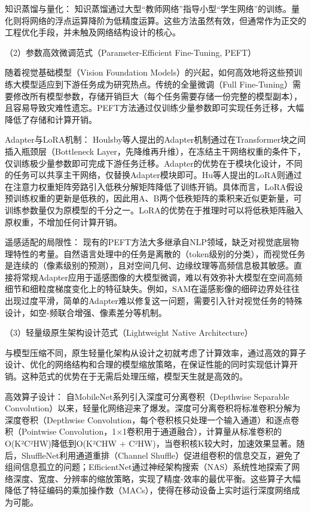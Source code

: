 知识蒸馏与量化： 知识蒸馏通过大型“教师网络”指导小型“学生网络”的训练。量化则将网络的浮点运算降阶为低精度运算。这些方法虽然有效，但通常作为正交的工程优化手段，并未触及网络结构设计的核心。

（2）参数高效微调范式（Parameter-Efficient Fine-Tuning, PEFT）

随着视觉基础模型（Vision Foundation Models）的兴起，如何高效地将这些预训练大模型适应到下游任务成为研究热点。传统的全量微调（Full Fine-Tuning）需要修改所有模型参数，存储开销巨大（每个任务需要存储一份完整的模型副本），且容易导致灾难性遗忘。PEFT方法通过仅训练少量参数即可实现任务迁移，大幅降低了存储和计算开销。

Adapter与LoRA机制： Houlsby等人提出的Adapter机制\cite{houlsby2019parameter}通过在Transformer块之间插入瓶颈层（Bottleneck Layer，先降维再升维），在冻结主干网络权重的条件下，仅训练极少量参数即可完成下游任务迁移。Adapter的优势在于模块化设计，不同的任务可以共享主干网络，仅替换Adapter模块即可。Hu等人提出的LoRA\cite{hu2022lora}则通过在注意力权重矩阵旁路引入低秩分解矩阵降低了训练开销。具体而言，LoRA假设预训练权重的更新是低秩的，因此用A、B两个低秩矩阵的乘积来近似更新量，可训练参数量仅为原模型的千分之一。LoRA的优势在于推理时可以将低秩矩阵融入原权重，不增加任何计算开销。

遥感适配的局限性： 现有的PEFT方法大多继承自NLP领域，缺乏对视觉底层物理特性的考量。自然语言处理中的任务是离散的（token级别的分类），而视觉任务是连续的（像素级别的预测），且对空间几何、边缘纹理等高频信息极其敏感。直接将常规Adapter应用于遥感图像的大模型微调，难以有效弥补大模型在空间高频细节和细粒度梯度变化上的特征缺失。例如，SAM在遥感影像的细碎边界处往往出现过度平滑，简单的Adapter难以修复这一问题，需要引入针对视觉任务的特殊设计，如空-频联合增强、像素差分等机制。

（3）轻量级原生架构设计范式（Lightweight Native Architecture）

与模型压缩不同，原生轻量化架构从设计之初就考虑了计算效率，通过高效的算子设计、优化的网络结构和合理的模型缩放策略，在保证性能的同时实现低计算开销。这种范式的优势在于无需后处理压缩，模型天生就是高效的。

高效算子设计： 自MobileNet\cite{howard2019searching}系列引入深度可分离卷积（Depthwise Separable Convolution）以来，轻量化网络迎来了爆发。深度可分离卷积将标准卷积分解为深度卷积（Depthwise Convolution，每个卷积核只处理一个输入通道）和逐点卷积（Pointwise Convolution，1×1卷积用于通道融合），计算量从标准卷积的O(K²C²HW)降低到O(K²CHW + C²HW)，当卷积核K较大时，加速效果显著。随后，ShuffleNet\cite{ma2019shuffle}利用通道重排（Channel Shuffle）促进组卷积的信息交互，避免了组间信息孤立的问题；EfficientNet\cite{tan2019efficient}通过神经架构搜索（NAS）系统性地探索了网络深度、宽度、分辨率的缩放策略，实现了精度-效率的最优平衡。这些算子大幅降低了特征编码的乘加操作数（MACs），使得在移动设备上实时运行深度网络成为可能。

